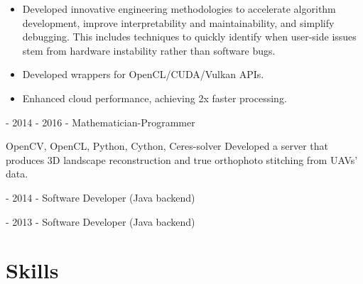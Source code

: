 \documentclass[11pt,oneside]{article}
\newcommand{\hhref}[2]{\href{#1}{\color{blue}#2}}
\begin{document}
\begin{description}
\begin{itemize}
      \item Developed innovative engineering methodologies to accelerate algorithm development, improve interpretability and maintainability, and simplify debugging. This includes techniques to quickly identify when user-side issues stem from hardware instability rather than software bugs.
      \item Developed wrappers for OpenCL/CUDA/Vulkan APIs.
      \item Enhanced cloud performance, achieving 2x faster processing.
    \end{itemize}
  \item[ - Transas] - 2014 - 2016 - Mathematician-Programmer %

    OpenCV, OpenCL, Python, Cython, Ceres-solver
    Developed a server that produces 3D landscape reconstruction and true orthophoto stitching from UAVs' data.

  \item[ - Yandex.Money] - 2014 - Software Developer (Java backend) %
  \item[ - DevExperts] - 2013 - Software Developer (Java backend) %
\end{description}


\vspace{-9pt}
\section*{\textbf{Skills}}
\vspace{-9pt}
\end{document}
